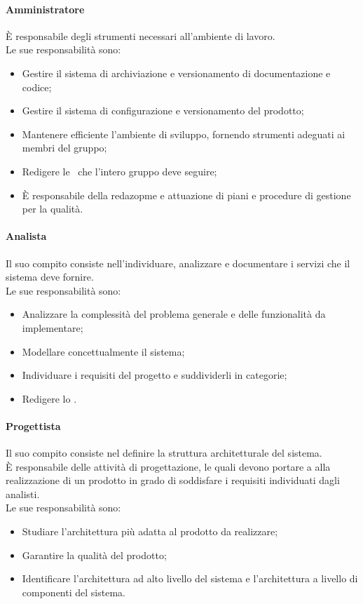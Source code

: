       \paragraph{Amministratore}
        È responsabile degli strumenti necessari all'ambiente di lavoro.\\
        Le sue responsabilità sono:
        \begin{itemize}
          \item Gestire il sistema di archiviazione e versionamento di documentazione e codice;
          \item Gestire il sistema di configurazione e versionamento del prodotto;
          \item Mantenere efficiente l'ambiente di sviluppo, fornendo strumenti adeguati ai membri del gruppo;
          \item Redigere le \docNameVersionNdP\ che l'intero gruppo deve seguire;
          \item È responsabile della redazopme e attuazione di piani e procedure di gestione per la qualità.
        \end{itemize}

      \paragraph{Analista}
        Il suo compito consiste nell'individuare, analizzare e documentare i servizi che il sistema deve fornire.\\
        Le sue responsabilità sono:
        \begin{itemize}
          \item Analizzare la complessità del problema generale e delle funzionalità da implementare;
          \item Modellare concettualmente il sistema;
          \item Individuare i requisiti del progetto e suddividerli in categorie;
          \item Redigere lo \docNameVersionSdF.
        \end{itemize}
      
      \paragraph{Progettista}
        Il suo compito consiste nel definire la struttura architetturale del sistema.\\
        È responsabile delle attività di progettazione, le quali devono portare a alla realizzazione di un prodotto in grado di soddisfare i requisiti individuati dagli analisti.\\
        Le sue responsabilità sono:
        \begin{itemize}
          \item Studiare l'architettura più adatta al prodotto da realizzare;
          \item Garantire la qualità del prodotto;
          \item Identificare l'architettura ad alto livello del sistema e l'architettura a livello di componenti del sistema.
        \end{itemize}

